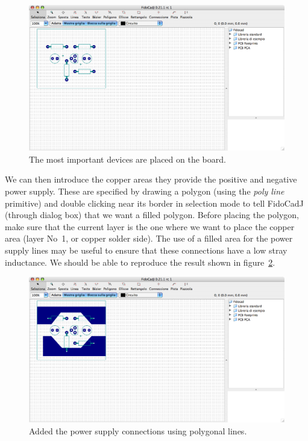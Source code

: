 \documentclass[10pt,a4paper,twoside]{scrreprt}
\begin{document}
%
\begin{figure}
\includegraphics[width=1\textwidth]{amplificateur_phase1}

\caption{The most important devices are placed on the board.}


\label{fig_amplificateur_phase1}
\end{figure}


We can then introduce the copper areas they provide the positive
and negative power supply. These are specified by drawing a polygon
(using the \emph{poly line} primitive) and double clicking near its border
in selection mode to tell FidoCadJ
(through dialog box) that we want a filled polygon. Before placing
the polygon, make sure that the current layer is the
one where we want to place the copper area (layer No~1, or copper
solder side). The use of a filled area for the power supply lines
may be useful to ensure that these connections have a low stray
inductance. We should be able to reproduce the result shown in figure~\ref{fig_amplificateur_phase2}.

%
\begin{figure}
\includegraphics[width=1\textwidth]{amplificateur_phase2}

\caption{Added the power supply connections using polygonal lines.}


\label{fig_amplificateur_phase2}
\end{figure}
\end{document}
